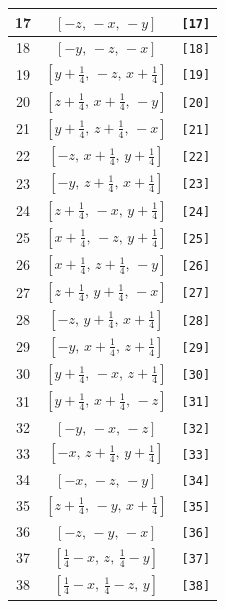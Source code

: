 \documentclass[fleqn,8pt]{jsarticle}
\begin{document}
\begin{longtable}{ccc}
17 & $\left[ - z,\, - x,\, - y \right]$ & {\tt [17]} \\ \hline
18 & $\left[ - y,\, - z,\, - x \right]$ & {\tt [18]} \\ \hline
19 & $\left[ y + \frac{1}{4},\, - z,\, x + \frac{1}{4} \right]$ & {\tt [19]} \\ \hline
20 & $\left[ z + \frac{1}{4},\, x + \frac{1}{4},\, - y \right]$ & {\tt [20]} \\ \hline
21 & $\left[ y + \frac{1}{4},\, z + \frac{1}{4},\, - x \right]$ & {\tt [21]} \\ \hline
22 & $\left[ - z,\, x + \frac{1}{4},\, y + \frac{1}{4} \right]$ & {\tt [22]} \\ \hline
23 & $\left[ - y,\, z + \frac{1}{4},\, x + \frac{1}{4} \right]$ & {\tt [23]} \\ \hline
24 & $\left[ z + \frac{1}{4},\, - x,\, y + \frac{1}{4} \right]$ & {\tt [24]} \\ \hline
25 & $\left[ x + \frac{1}{4},\, - z,\, y + \frac{1}{4} \right]$ & {\tt [25]} \\ \hline
26 & $\left[ x + \frac{1}{4},\, z + \frac{1}{4},\, - y \right]$ & {\tt [26]} \\ \hline
27 & $\left[ z + \frac{1}{4},\, y + \frac{1}{4},\, - x \right]$ & {\tt [27]} \\ \hline
28 & $\left[ - z,\, y + \frac{1}{4},\, x + \frac{1}{4} \right]$ & {\tt [28]} \\ \hline
29 & $\left[ - y,\, x + \frac{1}{4},\, z + \frac{1}{4} \right]$ & {\tt [29]} \\ \hline
30 & $\left[ y + \frac{1}{4},\, - x,\, z + \frac{1}{4} \right]$ & {\tt [30]} \\ \hline
31 & $\left[ y + \frac{1}{4},\, x + \frac{1}{4},\, - z \right]$ & {\tt [31]} \\ \hline
32 & $\left[ - y,\, - x,\, - z \right]$ & {\tt [32]} \\ \hline
33 & $\left[ - x,\, z + \frac{1}{4},\, y + \frac{1}{4} \right]$ & {\tt [33]} \\ \hline
34 & $\left[ - x,\, - z,\, - y \right]$ & {\tt [34]} \\ \hline
35 & $\left[ z + \frac{1}{4},\, - y,\, x + \frac{1}{4} \right]$ & {\tt [35]} \\ \hline
36 & $\left[ - z,\, - y,\, - x \right]$ & {\tt [36]} \\ \hline
37 & $\left[ \frac{1}{4} - x,\, z,\, \frac{1}{4} - y \right]$ & {\tt [37]} \\ \hline
38 & $\left[ \frac{1}{4} - x,\, \frac{1}{4} - z,\, y \right]$ & {\tt [38]} \\ \hline

\end{longtable}
\end{document}

